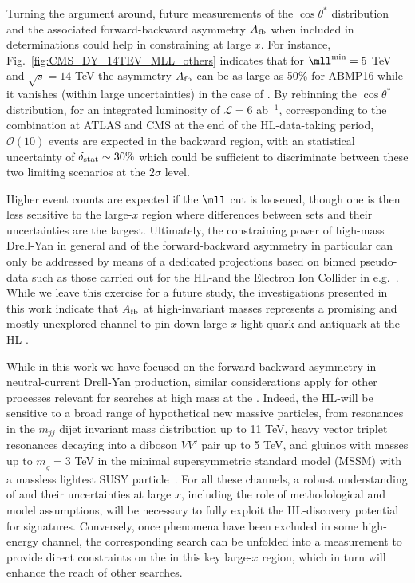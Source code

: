 Turning the argument around, future measurements of the $\cos\theta^*$
distribution and the associated forward-backward asymmetry 
$A_{\rm fb}$ when included in \pdf determinations could help in
constraining \pdfs at large $x$.
%
For instance, Fig.~\ref{fig:CMS_DY_14TEV_MLL_others} indicates that for
$\mll^{\rm min}=5$ TeV and $\sqrt{s}=14$ TeV the
asymmetry $A_{\rm fb}$ can be as large as 50\% for ABMP16
while it vanishes (within large uncertainties) in the case of .
%
By rebinning the $\cos\theta^*$ distribution, for an integrated
luminosity of $\mathcal{L}=6$ ab$^{-1}$, corresponding to the
combination at ATLAS and CMS 
at the end of the HL-\lhc data-taking period, $\mathcal{O}(10)$ events are expected in the backward region,
with an statistical uncertainty of $\delta_{\rm stat}\sim 30\%$ which could be sufficient to
discriminate between these two limiting scenarios at the $2\sigma$ level.

Higher event counts are expected if the $\mll$ cut is loosened, though one is
then less sensitive to the large-$x$ region where differences between \pdf sets and their
uncertainties are the largest.
%
Ultimately, the constraining power of high-mass Drell-Yan in general and of the forward-backward
asymmetry in particular can only be addressed by means of a dedicated projections
based on binned pseudo-data such as those carried
out for the HL-\lhc and the Electron Ion Collider in e.g.~\cite{AbdulKhalek:2018rok,Khalek:2021ulf}.
%
While we leave this exercise for a future study, the investigations
presented in this work indicate that $A_{\rm fb}$
at high-invariant masses represents a promising and mostly
unexplored channel to pin down large-$x$ light
quark and antiquark \pdfs at the HL-\lhc.

While in this work
we have focused on the forward-backward asymmetry in neutral-current Drell-Yan production,
similar considerations apply for other processes relevant
for \bsm searches at high mass at the \lhc.
%
Indeed, the HL-\lhc will be sensitive to a broad range of hypothetical
new massive particles, from resonances in the $m_{jj}$ dijet invariant mass distribution up to 11 TeV,
heavy vector triplet resonances decaying into a diboson $VV'$ pair up to 5 TeV,
and gluinos with masses up to $m_{\tilde{g}}=3$ TeV in the minimal
supersymmetric standard model (MSSM) with a massless lightest SUSY
particle~\cite{CidVidal:2018eel}.
%
For all these channels, a robust understanding of \pdfs
and their uncertainties at large $x$, including the role of
methodological and model assumptions, will be necessary to fully exploit
the HL-\lhc discovery potential for \bsm signatures.
%
%
Conversely, once \bsm phenomena have been excluded in some high-energy channel,
the corresponding search can be unfolded into a measurement to provide direct
constraints on the \pdfs in this key large-$x$ region, which in turn will
enhance the reach of other searches.

